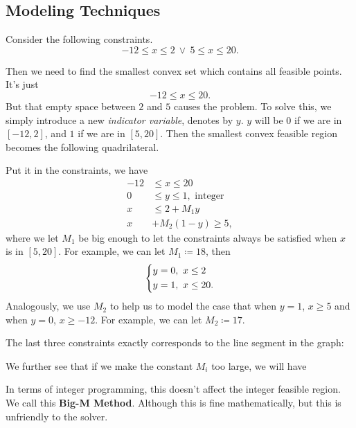 \subsection{Modeling Techniques}
\begin{eg}
	Consider the following constraints.
	\[
		-12\leq x\leq 2\ \lor\ 5\leq x\leq 20.
	\]
	\begin{figure}[H]
		\centering
		\label{fig:integer-programming-eg1}
	\end{figure}
	Then we need to find the smallest convex set which contains all feasible points. It's just
	\[
		-12\leq x\leq 20.
	\]
	But that empty space between \(2\) and \(5\) causes the problem. To solve this, we simply introduce a new \emph{indicator variable}, denotes
	by \(y\). \(y\) will be \(0\) if we are in \([-12, 2]\), and \(1\) if we are in \([5, 20]\). Then the smallest convex feasible region becomes
	the following quadrilateral.
	\begin{figure}[H]
		\centering
		\label{fig:integer-programming-eg1.2}
	\end{figure}
	Put it in the constraints, we have
	\[
		\begin{split}
			-12&\leq x\leq 20\\
			0&\leq y\leq 1, \text{ integer}\\
			x&\leq 2+M_1 y\\
			x&+M_2(1 - y)\geq 5,
		\end{split}
	\]
	where we let \(M_1\) be big enough to let the constraints always be satisfied when \(x\) is in \([5, 20]\). For example, we can let \(M_1\coloneqq 18\),
	then
	\[
		\begin{dcases}
			y = 0,\ x\leq 2 \\
			y = 1,\ x\leq 20.
		\end{dcases}
	\]
	Analogously, we use \(M_2\) to help us to model the case that when \(y = 1\), \(x\geq 5\) and when \(y = 0\), \(x\geq -12\). For example, we can let
	\(M_2 \coloneqq 17\).

	The last three constraints exactly corresponds to the line segment in the graph:
	\begin{figure}[H]
		\centering
		\label{fig:integer-programming-eg1.3}
	\end{figure}

	We further see that if we make the constant \(M_{i}\) too large, we will have
	\begin{figure}[H]
		\centering
		\label{fig:integer-programming-eg1.4}
	\end{figure}
	In terms of integer programming, this doesn't affect the integer feasible region. We call this \textbf{Big-M Method}. Although
	this is fine mathematically, but this is unfriendly to the solver.
\end{eg}

